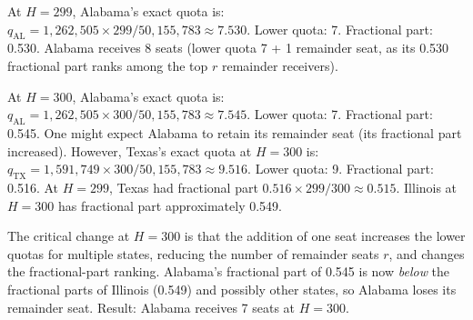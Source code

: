 At $H = 299$, Alabama's exact quota is:
$q_{\text{AL}} = 1{,}262{,}505 \times 299 / 50{,}155{,}783 \approx 7.530$.
Lower quota: 7. Fractional part: 0.530.
Alabama receives 8 seats (lower quota 7 + 1 remainder seat,
as its 0.530 fractional part ranks among the top $r$ remainder receivers).

At $H = 300$, Alabama's exact quota is:
$q_{\text{AL}} = 1{,}262{,}505 \times 300 / 50{,}155{,}783 \approx 7.545$.
Lower quota: 7. Fractional part: 0.545.
One might expect Alabama to retain its remainder seat (its fractional part increased).
However, Texas's exact quota at $H = 300$ is:
$q_{\text{TX}} = 1{,}591{,}749 \times 300 / 50{,}155{,}783 \approx 9.516$.
Lower quota: 9. Fractional part: 0.516.
At $H = 299$, Texas had fractional part $0.516 \times 299/300 \approx 0.515$.
Illinois at $H = 300$ has fractional part approximately 0.549.

The critical change at $H = 300$ is that the addition of one seat
increases the lower quotas for multiple states, reducing the number
of remainder seats $r$, and changes the fractional-part ranking.
Alabama's fractional part of 0.545 is now \emph{below} the fractional
parts of Illinois (0.549) and possibly other states, so Alabama
loses its remainder seat.
Result: Alabama receives 7 seats at $H = 300$.

